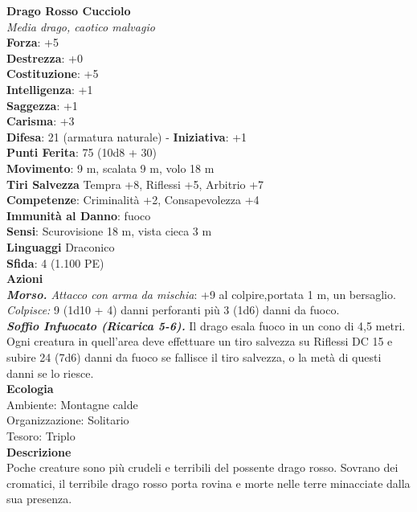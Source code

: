 \begin{multicols}{2}
\medskip\textbf{Drago Rosso Cucciolo}\\
\emph{Media drago, caotico malvagio}\\
\textbf{Forza}: +5\\
\textbf{Destrezza}: +0\\
\textbf{Costituzione}: +5\\
\textbf{Intelligenza}: +1\\
\textbf{Saggezza}: +1\\
\textbf{Carisma}: +3\\
\textbf{Difesa}: 21 (armatura naturale) - \textbf{Iniziativa}: +1\\
\textbf{Punti Ferita}: 75 (10d8 + 30)\\
\textbf{Movimento}: 9 m, scalata 9 m, volo 18 m\\
\textbf{Tiri Salvezza} Tempra +8, Riflessi +5, Arbitrio +7\\
\textbf{Competenze}: Criminalità +2, Consapevolezza +4\\
\textbf{Immunità al Danno}: fuoco\\
\textbf{Sensi}: Scurovisione 18 m, vista cieca 3 m\\
\textbf{Linguaggi} Draconico\\
\textbf{Sfida}: 4 (1.100 PE)\smallskip\\
\smallskip\textbf{Azioni}\\
\emph{\textbf{Morso.} Attacco con arma da mischia}: +9 al colpire,portata 1 m, un bersaglio. \\
\emph{Colpisce:} 9 (1d10 + 4) danni perforanti più 3 (1d6) danni da fuoco.\\
\emph{\textbf{Soffio Infuocato (Ricarica 5-6).}} Il drago esala fuoco in un cono di 4,5 metri. Ogni creatura in quell'area deve effettuare un tiro salvezza su Riflessi DC  15 e subire 24 (7d6) danni da fuoco se fallisce il tiro salvezza, o la metà di questi danni se lo riesce.\\
\textbf{Ecologia}\\
Ambiente: Montagne calde\\
Organizzazione: Solitario\\
Tesoro: Triplo\\
\textbf{Descrizione}\\
Poche creature sono più crudeli e terribili del possente drago rosso. Sovrano dei cromatici, il terribile drago rosso porta rovina e morte nelle terre minacciate dalla sua presenza.\\


\end{multicols}
